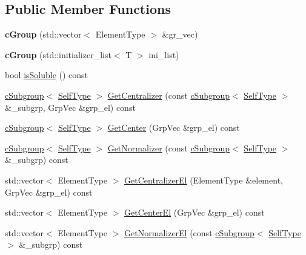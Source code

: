 \subsection*{Public Member Functions}
\begin{DoxyCompactItemize}
\item 
\hypertarget{classcGroup_a28f87c232c9d07ba9f9b0ec159e8243a}{{\bfseries c\-Group} (std\-::vector$<$ Element\-Type $>$ \&gr\-\_\-vec)}\label{classcGroup_a28f87c232c9d07ba9f9b0ec159e8243a}

\item 
\hypertarget{classcGroup_a38b515a0db10fa1fcebe7b635fc0d481}{{\bfseries c\-Group} (std\-::initializer\-\_\-list$<$ T $>$ ini\-\_\-list)}\label{classcGroup_a38b515a0db10fa1fcebe7b635fc0d481}

\item 
bool \hyperlink{classcGroup_acb69bf5f56805920d414a80ac5e54f36}{is\-Soluble} () const 
\item 
\hyperlink{classcSubgroup}{c\-Subgroup}$<$ \hyperlink{classcGroup}{Self\-Type} $>$ \hyperlink{classcGroup_a5177b0cd3b5a1c6d1dc7673c28fa14f0}{Get\-Centralizer} (const \hyperlink{classcSubgroup}{c\-Subgroup}$<$ \hyperlink{classcGroup}{Self\-Type} $>$ \&\-\_\-subgrp, Grp\-Vec \&grp\-\_\-el) const 
\item 
\hyperlink{classcSubgroup}{c\-Subgroup}$<$ \hyperlink{classcGroup}{Self\-Type} $>$ \hyperlink{classcGroup_ade523d25a78970fffa70f17d68643d15}{Get\-Center} (Grp\-Vec \&grp\-\_\-el) const 
\item 
\hyperlink{classcSubgroup}{c\-Subgroup}$<$ \hyperlink{classcGroup}{Self\-Type} $>$ \hyperlink{classcGroup_a1bcc2cdb6db5251b23cd099b25ffa057}{Get\-Normalizer} (const \hyperlink{classcSubgroup}{c\-Subgroup}$<$ \hyperlink{classcGroup}{Self\-Type} $>$ \&\-\_\-subgrp) const 
\item 
std\-::vector$<$ Element\-Type $>$ \hyperlink{classcGroup_ac0b8279834b59139afeb562be03937de}{Get\-Centralizer\-El} (Element\-Type \&element, Grp\-Vec \&grp\-\_\-el) const 
\item 
std\-::vector$<$ Element\-Type $>$ \hyperlink{classcGroup_aa0946d645c3ae06c56dc16f13a9f7ef2}{Get\-Center\-El} (Grp\-Vec \&grp\-\_\-el) const 
\item 
std\-::vector$<$ Element\-Type $>$ \hyperlink{classcGroup_a442a90478046593d38f5d131eb22b9a9}{Get\-Normalizer\-El} (const \hyperlink{classcSubgroup}{c\-Subgroup}$<$ \hyperlink{classcGroup}{Self\-Type} $>$ \&\-\_\-subgrp) const 
\end{DoxyCompactItemize}


